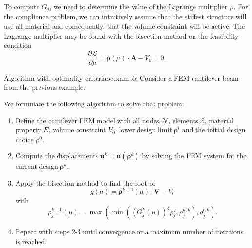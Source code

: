 To compute $G_j$, we need to determine the value of the Lagrange multiplier $\mu$. For the compliance problem, we can intuitively assume that the stiffest structure will use all material and consequently, that the volume constraint will be active. The Lagrange multiplier may be found with the bisection method on the feasibility condition
\begin{equation}
    \frac{\partial \mathcal{L}}{\partial \mu} = \pmb{\rho}(\mu) \cdot \mathbf{A} - V_0 = 0.
\end{equation}

\begin{example}{Algorithm with optimality criteria}{ocexample}
    Consider a FEM cantilever beam from the previous example. 

    We formulate the following algorithm to solve that problem: 
    \begin{enumerate}
        \item Define the cantilever FEM model with all nodes $\mathcal{N}$, elements $\mathcal{E}$, material property $E$, volume constraint $V_0$, lower design limit $\pmb{\rho}^l$ and the initial design choice $\pmb{\rho}^0$.
        \item Compute the displacements $\mathbf{u}^k = \mathbf{u}(\pmb{\rho}^k)$ by solving the FEM system for the current design $\pmb{\rho}^k$.
        \item Apply the bisection method to find the root of 
            \begin{equation}
                g(\mu) = \pmb{\rho}^{k+1}(\mu) \cdot \mathbf{V} - V_0
            \end{equation}
        with 
        \begin{equation}
            \rho^{k+1}_j(\mu) = \max \left( \min \left(\left(G_j^k(\mu)\right)^\xi \rho_j^k , \rho_j^{u,k} \right), \rho_j^{l,k} \right).
        \end{equation}
        \item Repeat with steps 2-3 until convergence or a maximum number of iterations is reached.
    \end{enumerate}
\end{example}

    
